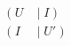 \documentclass[preview]{standalone}
\begin{document}
\begin{align*}
(  \;U\; &\big| \; I \; ) \\ (\;I \; &\big| \; U'\; )
\end{align*}
\end{document}
